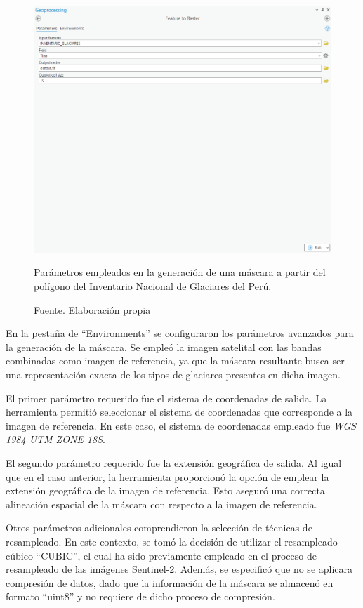 \documentclass[12pt]{report}
\begin{document}
\begin{figure}[H]
   \centering 
   \includegraphics[width=1\textwidth]{Images/generacion_mascara.png}
   \caption{Parámetros empleados en la generación de una máscara a partir del polígono del Inventario Nacional de Glaciares del Perú.}
   \caption*{Fuente. Elaboración propia}
   \label{fig:generacion_mascara}
\end{figure}

En la pestaña de “Environments” se configuraron los parámetros avanzados para la generación de la máscara. Se empleó la imagen satelital con las bandas combinadas como imagen de referencia, ya que la máscara resultante busca ser una representación exacta de los tipos de glaciares presentes en dicha imagen.

El primer parámetro requerido fue el sistema de coordenadas de salida. La herramienta permitió seleccionar el sistema de coordenadas que corresponde a la imagen de referencia. En este caso, el sistema de coordenadas empleado fue \textit{WGS 1984 UTM ZONE 18S}.

El segundo parámetro requerido fue la extensión geográfica de salida. Al igual que en el caso anterior, la herramienta proporcionó la opción de emplear la extensión geográfica de la imagen de referencia. Esto aseguró una correcta alineación espacial de la máscara con respecto a la imagen de referencia.

Otros parámetros adicionales comprendieron la selección de técnicas de resampleado. En este contexto, se tomó la decisión de utilizar el resampleado cúbico “CUBIC”, el cual ha sido previamente empleado en el proceso de resampleado de las imágenes Sentinel-2. Además, se especificó que no se aplicara compresión de datos, dado que la información de la máscara se almacenó en formato “uint8” y no requiere de dicho proceso de compresión.
\end{document}
